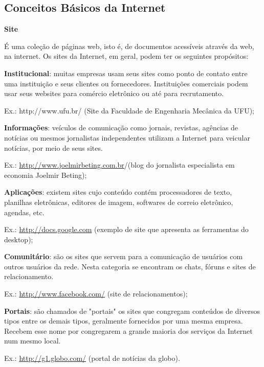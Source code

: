 \documentclass[12pt]{article}
\begin{document}
		\subsection{Conceitos Básicos da Internet}
		
		\textbf{Site}
		
		É uma coleção de páginas web, isto é, de documentos acessíveis através da web, na internet. Os sites da Internet, em geral, podem ter os seguintes propósitos:

		\textbf{Institucional}: muitas empresas usam seus sites como ponto de contato entre uma instituição e seus clientes ou fornecedores. Instituições comerciais podem usar seus websites para comércio eletrônico ou até para recrutamento. 
		
		Ex.: http://www.ufu.br/ (Site da Faculdade de Engenharia Mecânica da UFU);
		
		
		\textbf{Informações}: veículos de comunicação como jornais, revistas, agências de notícias ou mesmos jornalistas independentes utilizam a Internet para veicular notícias, por meio de seus sites. 
		
		Ex.: \url{http://www.joelmirbeting.com.br}/(blog do jornalista especialista em economia Joelmir Beting);
		
		
		\textbf{Aplicações}: existem sites cujo conteúdo contém processadores de texto, planilhas eletrônicas, editores de imagem, softwares de correio eletrônico, agendas, etc. 
		
		Ex.: \url{http://docs.google.com} (exemplo de site que apresenta as ferramentas do desktop);
		
		
		\textbf{Comunitário}: são os sites que servem para a comunicação de usuários com outros usuários da rede. Nesta categoria se encontram os chats, fóruns e sites de relacionamento. 
		
		Ex.: \url{http://www.facebook.com/} (site de relacionamentos);
		
		
		\textbf{Portais}: são chamados de "portais" os sites que congregam conteúdos de diversos tipos entre os demais tipos, geralmente fornecidos por uma mesma empresa. Recebem esse nome por congregarem a grande maioria dos serviços da Internet num mesmo local. 
		
		Ex.: \url{http://g1.globo.com/} (portal de notícias da globo).
				
	
\end{document}
